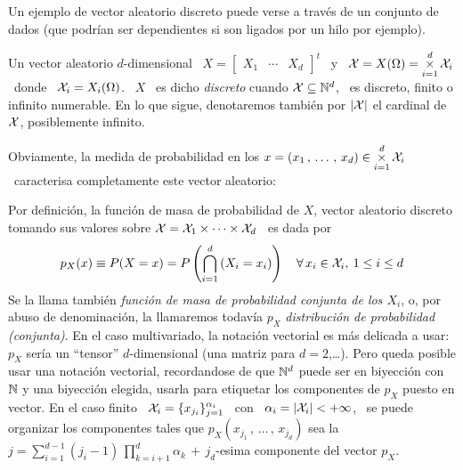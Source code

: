 \label{sec:MP:VecDiscreto}

Un ejemplo de vector aleatorio discreto puede verse a trav\'es de un conjunto de
dados (que podr\'ian  ser dependientes si son ligados por  un hilo por ejemplo).

\begin{definicion}
  Un  vector aleatorio $d$-dimensional  \ $X  = \begin{bmatrix}  X_1 &  \cdots &
    X_d \end{bmatrix}^t$ \ y \  $\displaystyle \mathcal{X} = X(\Omega) = \operatorname*{\times}_{i=1}^d
  \mathcal{X}_i$ \ donde \  $\mathcal{X}_i = X_i(\Omega)$. \ $X$ \ es  dicho {\it discreto} cuando
  $\mathcal{X} \subseteq \mathbb{N}^d$, \ es discreto, finito o infinito numerable.  En lo que
  sigue,  denotaremos tambi\'en  por $|\mathcal{X}|$  el cardinal  de  $\mathcal{X}$, posiblemente
  infinito.
\end{definicion}

Obviamente, la  medida de probabilidad  en los $\displaystyle  x = (x_1 \,  , \,
\ldots \, , \, x_d)  \in \operatorname*{\times}_{i=1}^d \mathcal{X}_i$ \ caracterisa completamente este
vector aleatorio:
%
\begin{definicion}
  Por  definici\'on,  la  funci\'on  de  masa de  probabilidad  de  $X$,  vector
  aleatorio discreto tomando  sus valores sobre $\mathcal{X} =  \mathcal{X}_1 \times \cdots \times
  \mathcal{X}_d$ \ es dada por
  \[
  p_X(x) \equiv  P(X =  x) =  P\left( \bigcap_{i=1}^d \left(  X_i =  x_i \right)
  \right) \quad \forall \, x_i \in \mathcal{X}_i, \: 1 \le i \le d
  \]
  Se la llama  tambi\'en {\it funci\'on de masa de  probabilidad conjunta de los
    $X_i$}, o, por  abuso de denominaci\'on, la llamaremos  todav\'ia $p_X$ {\it
    distribuci\'on  de probabilidad  (conjunta)}.  En  el caso  multivariado, la
  notaci\'on vectorial  es m\'as  delicada a usar:  $p_X$ ser\'ia  un ``tensor''
  $d$-dimensional (una matriz para $d = 2$,\ldots).  Pero queda posible usar una
  notaci\'on vectorial,  recordandose de que $\mathbb{N}^d$ puede  ser en biyecci\'on
  con $\mathbb{N}$ y  una biyecci\'on elegida, usarla para  etiquetar los componentes
  de  $p_X$  puesto  en  vector.   En  el  caso finito  \  $\mathcal{X}_i  =  \{  x_{j_i}
  \}_{j=1}^{\alpha_i}$  \  con \  $\alpha_i  = |\mathcal{X}_i|  <  +\infty$,  \ se  puede
  organizar  los  componentes tales  que  $p_X(x_{j_1}\, ,  \,  \ldots  \, ,  \,
  x_{j_d})$  sea   la  $\displaystyle  j   =  \sum_{i=1}^{d-1}  (j_i  -   1)  \,
  \prod_{k=i+1}^d \alpha_k \, + \, j_d$-esima componente del vector $p_X$.
\end{definicion}

